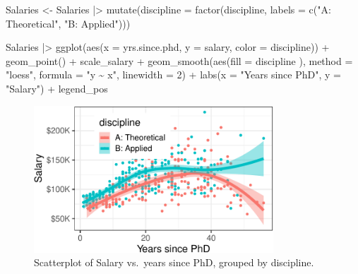 \documentclass[
  letterpaper,
  10pt,
  krantz2]{krantz}
\makeatletter
\newenvironment{Shaded}{\begin{snugshade}}{\end{snugshade}}
\newcommand{\AttributeTok}[1]{\textcolor[rgb]{0.40,0.45,0.13}{#1}}
\newcommand{\DecValTok}[1]{\textcolor[rgb]{0.68,0.00,0.00}{#1}}
\newcommand{\FunctionTok}[1]{\textcolor[rgb]{0.28,0.35,0.67}{#1}}
\newcommand{\NormalTok}[1]{\textcolor[rgb]{0.00,0.23,0.31}{#1}}
\newcommand{\OtherTok}[1]{\textcolor[rgb]{0.00,0.23,0.31}{#1}}
\newcommand{\SpecialCharTok}[1]{\textcolor[rgb]{0.37,0.37,0.37}{#1}}
\newcommand{\StringTok}[1]{\textcolor[rgb]{0.13,0.47,0.30}{#1}}
\newenvironment{kframe}{%
  \medskip{}
  \setlength{\fboxsep}{.8em}
  \def\at@end@of@kframe{}%
  \ifinner\ifhmode%
  \def\at@end@of@kframe{\end{minipage}}%
  \begin{minipage}{\columnwidth}%
  \fi\fi%
  \def\FrameCommand##1{\hskip\@totalleftmargin \hskip-\fboxsep
  \colorbox{shadecolor}{##1}\hskip-\fboxsep
      \hskip-\linewidth \hskip-\@totalleftmargin \hskip\columnwidth}%
  \MakeFramed {\advance\hsize-\width
    \@totalleftmargin\z@ \linewidth\hsize
    \@setminipage}}%
{\par\unskip\endMakeFramed%
  \at@end@of@kframe}
\renewenvironment{Shaded}{\begin{kframe}}{\end{kframe}}
\makeatother
\begin{document}
\begin{Shaded}
\begin{Highlighting}[]
\NormalTok{Salaries }\OtherTok{\textless{}{-}}\NormalTok{ Salaries }\SpecialCharTok{|\textgreater{}}
  \FunctionTok{mutate}\NormalTok{(}\AttributeTok{discipline =} \FunctionTok{factor}\NormalTok{(discipline, }
                             \AttributeTok{labels =} \FunctionTok{c}\NormalTok{(}\StringTok{"A: Theoretical"}\NormalTok{, }\StringTok{"B: Applied"}\NormalTok{)))}

\NormalTok{Salaries }\SpecialCharTok{|\textgreater{}}
  \FunctionTok{ggplot}\NormalTok{(}\FunctionTok{aes}\NormalTok{(}\AttributeTok{x =}\NormalTok{ yrs.since.phd, }\AttributeTok{y =}\NormalTok{ salary, }\AttributeTok{color =}\NormalTok{ discipline)) }\SpecialCharTok{+}
    \FunctionTok{geom\_point}\NormalTok{() }\SpecialCharTok{+}
\NormalTok{  scale\_salary }\SpecialCharTok{+}
  \FunctionTok{geom\_smooth}\NormalTok{(}\FunctionTok{aes}\NormalTok{(}\AttributeTok{fill =}\NormalTok{ discipline ),}
                \AttributeTok{method =} \StringTok{"loess"}\NormalTok{, }\AttributeTok{formula =} \StringTok{"y \textasciitilde{} x"}\NormalTok{, }
                \AttributeTok{linewidth =} \DecValTok{2}\NormalTok{) }\SpecialCharTok{+} 
  \FunctionTok{labs}\NormalTok{(}\AttributeTok{x =} \StringTok{"Years since PhD"}\NormalTok{,}
       \AttributeTok{y =} \StringTok{"Salary"}\NormalTok{) }\SpecialCharTok{+}
\NormalTok{  legend\_pos }
\end{Highlighting}
\end{Shaded}

\begin{figure}[H]

{\centering \includegraphics[width=0.8\textwidth,height=\textheight]{figs/ch03/fig-Salaries-discipline-1.pdf}

}

\caption{\label{fig-Salaries-discipline}Scatterplot of Salary vs.~years
since PhD, grouped by discipline.}

\end{figure}
\end{document}
